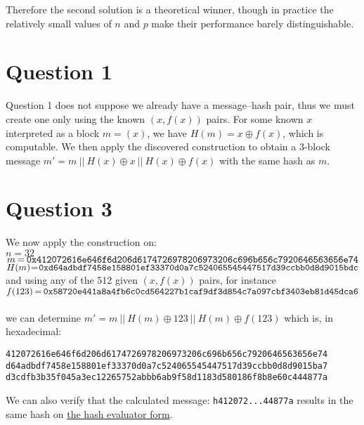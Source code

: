 \documentclass[11pt]{llncs}
\begin{document}
Therefore the second solution is a theoretical winner, though in practice the relatively small values of $n$ and $p$ make their performance barely distinguishable.

\section{Question 1}

Question 1 does not suppose we already have a message--hash pair, thus we must create one only using the known $(x,f(x))$ pairs. For some known $x$ interpreted as a block $m = (x)$, we have $H(m) = x \oplus f(x)$, which is computable. We then apply the discovered construction to obtain a 3-block message $m' = m\ ||\ H(x) \oplus x\ ||\ H(x) \oplus f(x)$ with the same hash as $m$.

\section{Question 3}

We now apply the construction on: \\
$ n = 32 $ \\
$ m\hspace{-0.8pt}=\hspace{-0.8pt}\texttt{0x412072616e646f6d206d6174726978206973206c696b656c7920646563656e74}$ \\
\vspace{4pt}$ H(m)\hspace{-2pt}=\hspace{-2pt}\texttt{0xd64adbdf7458e158801ef33370d0a7c524065545447517d39ccbb0d8d9015bdc}$ \\
and using any of the 512 given $(x, f(x))$ pairs, for instance \vspace{4pt}\\
$ f(123)\hspace{-1pt}=\hspace{-1pt} \texttt{0x58720e441a8a4fb6c0cd564227b1caf9df3d854c7a097cbf3403eb81d45dca6} $\\\vspace{-4pt}\\
we can determine $m' = m\ ||\ H(m) \oplus 123\ ||\ H(m) \oplus f(123)$ which is, in hexadecimal:
\begin{center}
\texttt{412072616e646f6d206d6174726978206973206c696b656c7920646563656e74}\\
\texttt{d64adbdf7458e158801ef33370d0a7c524065545447517d39ccbb0d8d9015ba7}\\
\texttt{d3cdfb3b35f045a3ec12265752abbb6ab9f58d1183d580186f8b8e60c444877a}\\
\end{center}
We can also verify that the calculated message: \texttt{h412072...44877a} results in the same hash on \href{https://nsucrypto.nsu.ru/olymp/2020/round/2/task/8/}{the hash evaluator form}.
\end{document}
